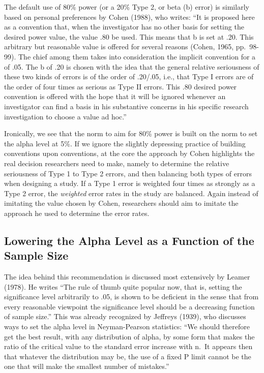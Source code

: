 \documentclass[,jou,floatsintext]{apa6}
\begin{document}
The default use of 80\% power (or a 20\% Type 2, or beta (b) error) is similarly based on personal preferences by Cohen (1988), who writes: \enquote{It is proposed here as a convention that, when the investigator has no other basis for setting the desired power value, the value .80 be used. This means that b is set at .20. This arbitrary but reasonable value is offered for several reasons (Cohen, 1965, pp.~98-99). The chief among them takes into consideration the implicit convention for a of .05. The b of .20 is chosen with the idea that the general relative seriousness of these two kinds of errors is of the order of .20/.05, i.e., that Type I errors are of the order of four times as serious as Type II errors. This .80 desired power convention is offered with the hope that it will be ignored whenever an investigator can find a basis in his substantive concerns in his specific research investigation to choose a value ad hoc.}

Ironically, we see that the norm to aim for 80\% power is built on the norm to set the alpha level at 5\%. If we ignore the slightly depressing practice of building conventions upon conventions, at the core the approach by Cohen highlights the real decision researchers need to make, namely to determine the relative seriousness of Type 1 to Type 2 errors, and then balancing both types of errors when designing a study. If a Type 1 error is weighted four times as strongly as a Type 2 error, the \emph{weighted} error rates in the study are balanced. Again instead of imitating the value chosen by Cohen, researchers should aim to imitate the approach he used to determine the error rates.

\hypertarget{lowering-the-alpha-level-as-a-function-of-the-sample-size}{%
\subsection{Lowering the Alpha Level as a Function of the Sample Size}\label{lowering-the-alpha-level-as-a-function-of-the-sample-size}}

The idea behind this recommendation is discussed most extensively by Leamer (1978). He writes \enquote{The rule of thumb quite popular now, that is, setting the significance level arbitrarily to .05, is shown to be deficient in the sense that from every reasonable viewpoint the significance level should be a decreasing function of sample size.} This was already recognized by Jeffreys (1939), who discusses ways to set the alpha level in Neyman-Pearson statistics: \enquote{We should therefore get the best result, with any distribution of alpha, by some form that makes the ratio of the critical value to the standard error increase with n.~It appears then that whatever the distribution may be, the use of a fixed P limit cannot be the one that will make the smallest number of mistakes.}
\end{document}
